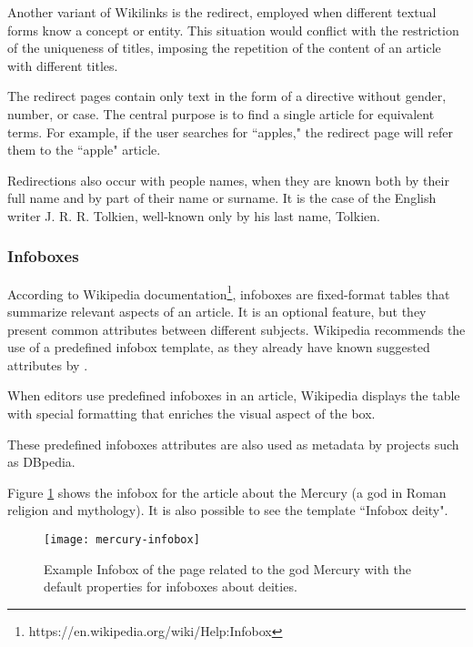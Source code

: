 Another variant of Wikilinks is the redirect, employed when different textual forms know a concept or entity. This situation would conflict with the restriction of the uniqueness of titles, imposing the repetition of the content of an article with different titles. 

The redirect pages contain only text in the form of a directive without gender, number, or case. The central purpose is to find a single article for equivalent terms. For example, if the user searches for ``apples," the redirect page will refer them to the ``apple" article. 

Redirections also occur with people names, when they are known both by their full name and by part of their name or surname. It is the case of the English writer  J. R. R. Tolkien, well-known only by his last name, Tolkien.

\subsubsection{\hspace*{3pt} Infoboxes}

According to Wikipedia documentation\footnote{https://en.wikipedia.org/wiki/Help:Infobox}, infoboxes are fixed-format tables that summarize relevant aspects of an article. It is an optional feature, but they present common attributes between different subjects. Wikipedia recommends the use of a predefined infobox template, as they already have known suggested attributes by 
. 

When editors use predefined infoboxes in an article, Wikipedia displays the table with special formatting that enriches the visual aspect of the box. 

These predefined infoboxes attributes are also used as metadata by projects such as DBpedia. 

Figure \ref{fig:mercury-infobox} shows the infobox for the article about the Mercury (a god in Roman religion and mythology). It is also possible to see the template ``Infobox deity". 



\begin{figure}[!h]
\centering
  \texttt{[image: mercury-infobox]}
  \caption{Example Infobox of the page related to the god Mercury with the default properties for infoboxes about deities.}
  \label{fig:mercury-infobox}
\end{figure}



